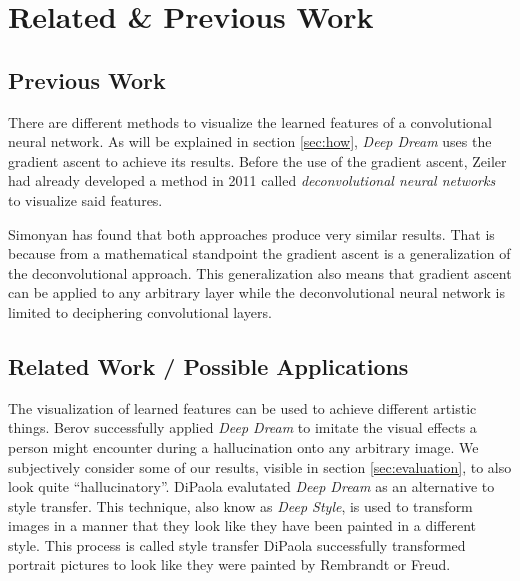 \section{Related \& Previous Work}
\label{sec:previous-work}
\subsection{Previous Work}
There are different methods to visualize the learned features of a convolutional neural network.
As will be explained in section \ref{sec:how}, \textit{Deep Dream} uses the gradient ascent to achieve its results.
Before the use of the gradient ascent, Zeiler had already developed a method in 2011 called \emph{deconvolutional neural networks} to visualize said features.\cite{zeiler2011adaptive}

Simonyan has found that both approaches produce very similar results.
That is because from a mathematical standpoint the gradient ascent is a generalization of the deconvolutional approach.
This generalization also means that gradient ascent can be applied to any arbitrary layer while the deconvolutional neural network is limited to deciphering convolutional layers.\cite{simonyan2013deep}

\subsection{Related Work / Possible Applications}
The visualization of learned features can be used to achieve different artistic things.
Berov successfully applied \textit{Deep Dream} to imitate the visual effects a person might encounter during a hallucination onto any arbitrary image.\cite{berov2016visual}
We subjectively consider some of our results, visible in section \ref{sec:evaluation}, to also look quite \enquote{hallucinatory}.
DiPaola evalutated \textit{Deep Dream} as an alternative to style transfer.
This technique, also know as \emph{Deep Style}, is used to transform images in a manner that they look like they have been painted in a different style.\cite{dipaola2016using}
This process is called style transfer
DiPaola successfully transformed portrait pictures to look like they were painted by Rembrandt or Freud.
